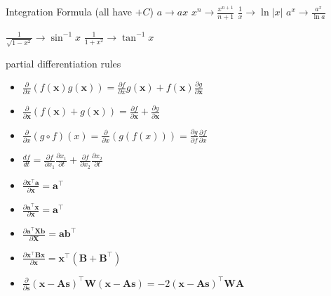 \documentclass[UTF8,a4paper]{article}
\begin{document}
\begin{cheatsheetblock}{Integration Formula (all have $+C$)}
    $a \to ax$ \hfill $x^n \to \frac{x^{n+1}}{n+1}$ \hfill $\frac{1}{x} \to \ln|x|$ \hfill $a^x \to \frac{a^x}{\ln a}$

    $\frac{1}{\sqrt{1-x^2}} \to \sin^{-1} x$ \hfill $\frac{1}{1+x^2} \to \tan^{-1} x$ 
\end{cheatsheetblock}


\begin{cheatsheetblock}{partial differentiation rules}
    \begin{itemize}
        \item $\frac{\partial}{\partial x}(f(\boldsymbol{x}) g(\boldsymbol{x}))=\frac{\partial f}{\partial x} g(\boldsymbol{x})+f(\boldsymbol{x}) \frac{\partial g}{\partial \boldsymbol{x}}$ \hfill {}
        \item $\frac{\partial}{\partial \boldsymbol{x}}(f(\boldsymbol{x})+g(\boldsymbol{x}))=\frac{\partial f}{\partial \boldsymbol{x}}+\frac{\partial g}{\partial \boldsymbol{x}}$ \hfill {}
        \item $\frac{\partial}{\partial x}(g \circ f)(x)=\frac{\partial}{\partial x}(g(f(x)))=\frac{\partial g}{\partial f} \frac{\partial f}{\partial x}$ \hfill {}
        \item $\frac{d f}{d t}=\frac{\partial f}{\partial x_1} \frac{\partial x_1}{\partial t}+\frac{\partial f}{\partial x_2} \frac{\partial x_2}{\partial t}$     \hfill {}
        \item $\frac{\partial \bm{x}^\top \bm{a}}{\partial \bm{x}} = \bm{a}^\top$
        \item $\frac{\partial \bm{a}^\top \bm{x}}{\partial \bm{x}} = \bm{a}^\top$
        \item $\frac{\partial \bm{a}^\top \bm{X} \bm{b}}{\partial \bm{X}} = \bm{a} \bm{b}^\top$
        \item $\frac{\partial \bm{x}^\top \bm{B} \bm{x}}{\partial \bm{x}} = \bm{x}^\top (\bm{B} + \bm{B}^\top)$
        \item $\frac{\partial}{\partial \bm{s}} (\bm{x} - \bm{A}\bm{s})^\top \bm{W} (\bm{x} - \bm{A}\bm{s}) = -2 (\bm{x} - \bm{A}\bm{s})^\top \bm{WA}$
    \end{itemize}
\end{cheatsheetblock}
\end{document}
